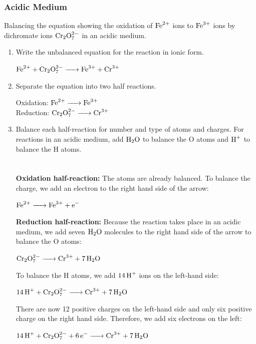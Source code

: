 \documentclass[a4paper,12pt,twocolumn]{article}
\begin{document}
\subsubsection{Acidic Medium}
{\large Balancing the equation showing the oxidation of $\ce{Fe^{2+}}$ ions to $\ce{Fe^{3+}}$ ions by dichromate ions $\ce{Cr2O^{2-}7}$ in an acidic medium.}
\begin{enumerate}
\item Write the unbalanced equation for the reaction in ionic form.
\begin{center}
$\ce{Fe^{2+} + Cr2O^{2-}7 -> Fe^{3+} + Cr^{3+}}$
\end{center}
\item Separate the equation into two half reactions.\\
\begin{center}
Oxidation: $\ce{Fe^{2+} -> Fe^{3+}}$\\
Reduction: $\ce{Cr2O^{2-}7 -> Cr^{3+}}$
\end{center}
\item Balance each half-reaction for number and type of atoms and charges. For reactions in an acidic medium, add $\ce{H2O}$ to balance the O atoms and $\ce{H^+}$ to balance the H atoms.\\
\\
\\
\textbf{Oxidation half-reaction:} The atoms are already balanced. To balance the charge, we add an electron to the right hand side of the arrow:
    \begin{center}
        $\ce{Fe^{2+} -> Fe^{3+} + e^-}$
    \end{center}
    \textbf{Reduction half-reaction:} Because the reaction takes place in an acidic medium, we add seven $\ce{H2O}$ molecules to the right hand side of the arrow to balance the O atoms:
    \begin{center}
    $\ce{Cr2O^{2-}7 -> Cr^{3+} + 7H2O}$
    \end{center}
    To balance the H atoms, we add $\ce{14H^+}$ ions on the left-hand side:\
    \begin{center}
    $\ce{14H^+ + Cr2O^{2-}7 -> Cr^{3+} + 7H2O}$
    \end{center}
    There are now 12 positive charges on the left-hand side and only six positive charge on the right hand side. Therefore, we add six electrons on the left:
    \begin{center}
     $\ce{14H^+ + Cr2O^{2-}7 + 6e^- -> Cr^{3+} + 7H2O}$
    \end{center}

\end{enumerate}
\end{document}

